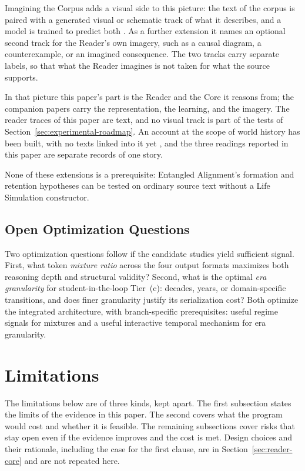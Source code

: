 \documentclass[11pt]{article}
\begin{document}
Imagining the Corpus adds a visual side to this picture: the text of the
corpus is paired with a generated visual or schematic track of what it
describes, and a model is trained to predict both
\cite{westerbergImagining2026}. As a further extension it names an optional
second track for the Reader's own imagery, such as a causal diagram, a
counterexample, or an imagined consequence. The two tracks carry separate
labels, so that what the Reader imagines is not taken for what the source
supports.

In that picture this paper's part is the Reader and the Core it reasons from;
the companion papers carry the representation, the learning, and the imagery.
The reader traces of this paper are text, and no visual track is part of the
tests of Section~\ref{sec:experimental-roadmap}. An account at the scope of
world history has been built, with no texts linked into it yet
\cite{westerbergMeaning2026,westerbergLifeSimulation2026}, and the three
readings reported in this paper are separate records of one story.

None of these extensions is a prerequisite:
Entangled Alignment's formation and retention hypotheses can be tested on
ordinary source text without a Life Simulation constructor.

\subsection{Open Optimization Questions}\label{sec:open-optimization}

Two optimization questions follow if the candidate studies yield sufficient signal. First, what token \emph{mixture ratio} across the four output formats maximizes both reasoning depth and structural validity? Second, what is the optimal \emph{era granularity} for student-in-the-loop Tier~(c): decades, years, or domain-specific transitions, and does finer granularity justify its serialization cost? Both optimize the integrated architecture, with branch-specific prerequisites: useful regime signals for mixtures and a useful interactive temporal mechanism for era granularity.

\section{Limitations}\label{sec:limitations}


The limitations below are of three kinds, kept apart. The first subsection
states the limits of the evidence in this paper. The second covers what the
program would cost and whether it is feasible. The remaining subsections cover
risks that stay open even if the evidence improves and the cost is met. Design
choices and their rationale, including the case for the first clause, are in
Section~\ref{sec:reader-core} and are not repeated here.
\end{document}
